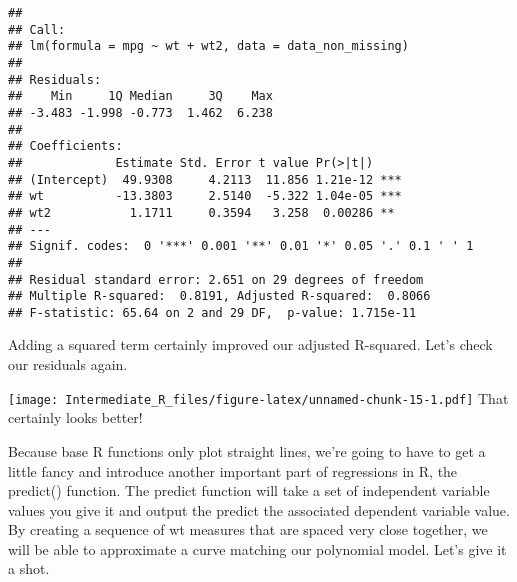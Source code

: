 \documentclass[]{article}
\newenvironment{Shaded}{\begin{snugshade}}{\end{snugshade}}
\newcommand{\KeywordTok}[1]{\textcolor[rgb]{0.13,0.29,0.53}{\textbf{#1}}}
\newcommand{\DecValTok}[1]{\textcolor[rgb]{0.00,0.00,0.81}{#1}}
\newcommand{\OperatorTok}[1]{\textcolor[rgb]{0.81,0.36,0.00}{\textbf{#1}}}
\newcommand{\NormalTok}[1]{#1}
\begin{document}
\begin{verbatim}
## 
## Call:
## lm(formula = mpg ~ wt + wt2, data = data_non_missing)
## 
## Residuals:
##    Min     1Q Median     3Q    Max 
## -3.483 -1.998 -0.773  1.462  6.238 
## 
## Coefficients:
##             Estimate Std. Error t value Pr(>|t|)    
## (Intercept)  49.9308     4.2113  11.856 1.21e-12 ***
## wt          -13.3803     2.5140  -5.322 1.04e-05 ***
## wt2           1.1711     0.3594   3.258  0.00286 ** 
## ---
## Signif. codes:  0 '***' 0.001 '**' 0.01 '*' 0.05 '.' 0.1 ' ' 1
## 
## Residual standard error: 2.651 on 29 degrees of freedom
## Multiple R-squared:  0.8191, Adjusted R-squared:  0.8066 
## F-statistic: 65.64 on 2 and 29 DF,  p-value: 1.715e-11
\end{verbatim}

Adding a squared term certainly improved our adjusted R-squared. Let's
check our residuals again.

\begin{Shaded}
\end{Shaded}

\texttt{[image: Intermediate\_R\_files/figure-latex/unnamed-chunk-15-1.pdf]}
That certainly looks better!

Because base R functions only plot straight lines, we're going to have
to get a little fancy and introduce another important part of
regressions in R, the predict() function. The predict function will take
a set of independent variable values you give it and output the predict
the associated dependent variable value. By creating a sequence of wt
measures that are spaced very close together, we will be able to
approximate a curve matching our polynomial model. Let's give it a shot.
\end{document}
